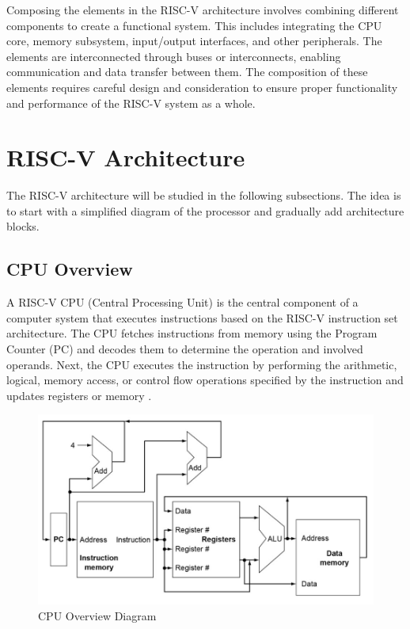         Composing the elements in the RISC-V architecture involves combining different components to create a functional system. This includes integrating the CPU core, memory subsystem, input/output interfaces, and other peripherals. The elements are interconnected through buses or interconnects, enabling communication and data transfer between them. The composition of these elements requires careful design and consideration to ensure proper functionality and performance of the RISC-V system as a whole.

    \section{RISC-V Architecture} \label{sec:section_riscv_prof.2}
    
    The RISC-V architecture will be studied in the following subsections. The idea is to start with a simplified diagram of the processor and gradually add architecture blocks.

        \subsection{CPU Overview}
        
        A RISC-V CPU (Central Processing Unit) is the central component of a computer system that executes instructions based on the RISC-V instruction set architecture. The CPU fetches instructions from memory using the Program Counter (PC) and decodes them to determine the operation and involved operands. Next, the CPU executes the instruction by performing the arithmetic, logical, memory access, or control flow operations specified by the instruction and updates registers or memory \cite{patterson}.
        
                \begin{figure}[!h]
        	    \centering
        	    \includegraphics[width= 0.7
        	    \textwidth]{figures/riscv/risc_1.jpg}
                    \caption{\label{risc_1} CPU Overview Diagram}
                \end{figure}
        

